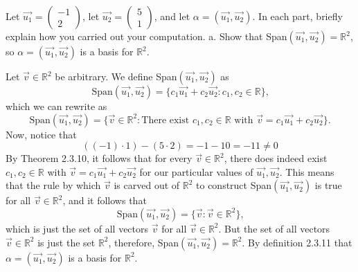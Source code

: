 \documentclass[12pt]{article}
\newenvironment{problem}[2][Problem]
{
	\begin{trivlist} 
		\item[\hskip \labelsep {\bfseries #1 #2:}]
	}
{
	\end{trivlist}
	}
\newenvironment{solution}[1][Solution]
{
	\begin{trivlist} 
		\item[\hskip \labelsep {\itshape #1:}]
	}
	{
	\end{trivlist}
}
\begin{document}
\newpage
\begin{problem}{3}
Let $\vec{u_{1}} = \begin{pmatrix}-1 \\ 2 \end{pmatrix}$, let $\vec{u_{2}} = \begin{pmatrix}5 \\ 1 \end{pmatrix}$, and let $\alpha = (\vec{u_{1}}, \vec{u_{2}})$. In each part, briefly explain how you carried out your computation. 
\noindent
\newline
\newline
a. Show that Span$(\vec{u_{1}}, \vec{u_{2}})= \mathbb{R}^2$, so $\alpha=(\vec{u_{1}}, \vec{u_{2}})$ is a basis for $\mathbb{R}^2$.
\begin{solution}
Let $\vec{v} \in \mathbb{R}^2$ be arbitrary. %
We define Span$(\vec{u_{1}}, \vec{u_{2}})$ as
\[
\text{Span}(\vec{u_{1}}, \vec{u_{2}}) = \{c_{1}\vec{u_{1}} + c_{2}\vec{u_{2}} : c_{1},c_{2} \in \mathbb{R}\}\text{,}
\]
which we can rewrite as
\[
\text{Span}(\vec{u_{1}}, \vec{u_{2}}) = \{\vec{v} \in \mathbb{R}^2: \text{There exist } c_{1},c_{2} \in \mathbb{R} \text{ with } \vec{v}=c_{1}\vec{u_{1}} + c_{2}\vec{u_{2}}\}\text{.} 
\]
Now, notice that
\[
((-1) \cdot 1) - (5 \cdot 2) = -1 - 10 = -11 \neq 0
\]
By Theorem 2.3.10, it follows that for every $\vec{v} \in \mathbb{R}^2$, there does indeed exist $c_{1},c_{2} \in \mathbb{R}$ with $\vec{v}=c_{1}\vec{u_{1}} + c_{2}\vec{u_{2}}$ for our particular values of $\vec{u_{1}},\vec{u_{2}}$. This means that the rule by which $\vec{v}$ is carved out of $\mathbb{R}^2$ to construct  Span$(\vec{u_{1}}, \vec{u_{2}})$ is true for all $\vec{v} \in \mathbb{R}^2$, and it follows that
\[
\text{Span}(\vec{u_{1}}, \vec{u_{2}})=\{\vec{v} : \vec{v} \in \mathbb{R}^2\}\text{,}
\]
which is just the set of all vectors $\vec{v}$ for all $\vec{v} \in \mathbb{R}^2$. But the set of all vectors $\vec{v} \in \mathbb{R}^2$ is just the set $\mathbb{R}^2$, therefore, Span$(\vec{u_{1}}, \vec{u_{2}}) = \mathbb{R}^2$. By definition 2.3.11 that $\alpha=(\vec{u_{1}}, \vec{u_{2}})$ is a basis for $\mathbb{R}^2$.


\end{solution}
\end{problem}
\end{document}
